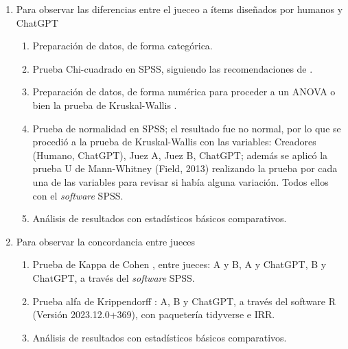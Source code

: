 \begin{enumerate}[label=\Alph*)]
\item Para observar las diferencias entre el jueceo a ítems diseñados por humanos y ChatGPT
\begin{enumerate}[label=\arabic*.]
\item Preparación de datos, de forma categórica.
\item Prueba Chi-cuadrado en SPSS, siguiendo las recomendaciones de \cite{Field2013}.
\item Preparación de datos, de forma numérica para proceder a un ANOVA o
bien la prueba de Kruskal-Wallis \cite{Field2013,Howell2012}.
\item Prueba de normalidad en SPSS; el resultado fue no normal, por lo que
se procedió a la prueba de Kruskal-Wallis con las variables: Creadores
(Humano, ChatGPT), Juez A, Juez B, ChatGPT; además se aplicó la prueba
U de Mann-Whitney (Field, 2013) realizando la prueba por cada una de
las variables para revisar si había alguna variación. Todos ellos con
el \emph{software} SPSS.
\item Análisis de resultados con estadísticos básicos comparativos.
\end{enumerate}

\item Para observar la concordancia entre jueces
\begin{enumerate}[label=\arabic*.]
\item Prueba de Kappa de Cohen \cite{McHugh2012}, entre jueces: A y B, A y
ChatGPT, B y ChatGPT, a través del \emph{software} SPSS.
\item Prueba alfa de Krippendorff \cite{Hayes2007}: A, B y ChatGPT, a través del software R (Versión 2023.12.0+369), con	paquetería tidyverse e IRR.
\item Análisis de resultados con estadísticos básicos comparativos.
\end{enumerate}

\end{enumerate}